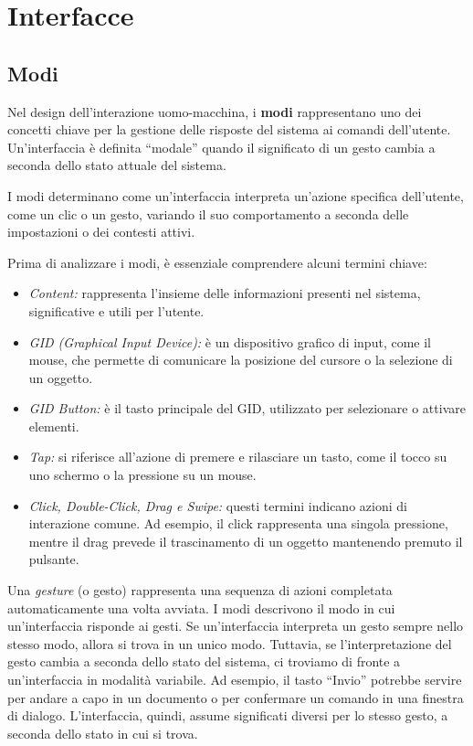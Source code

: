 \chapter{Interfacce}
\section{Modi}
\begin{redbar}
Nel design dell’interazione uomo-macchina, i \textbf{modi} rappresentano uno dei concetti chiave per la gestione delle risposte del sistema ai comandi dell’utente. Un'interfaccia è definita “modale” quando il significato di un gesto cambia a seconda dello stato attuale del sistema. 
\end{redbar}

I modi determinano come un'interfaccia interpreta un'azione specifica dell'utente, come un clic o un gesto, variando il suo comportamento a seconda delle impostazioni o dei contesti attivi.

Prima di analizzare i modi, è essenziale comprendere alcuni termini chiave:
\begin{itemize}
    \item \textit{Content:} rappresenta l'insieme delle informazioni presenti nel sistema, significative e utili per l'utente.
    \item \textit{GID (Graphical Input Device):} è un dispositivo grafico di input, come il mouse, che permette di comunicare la posizione del cursore o la selezione di un oggetto.
    \item \textit{GID Button:} è il tasto principale del GID, utilizzato per selezionare o attivare elementi.
    \item \textit{Tap:} si riferisce all'azione di premere e rilasciare un tasto, come il tocco su uno schermo o la pressione su un mouse.
    \item \textit{Click, Double-Click, Drag e Swipe:} questi termini indicano azioni di interazione comune. Ad esempio, il click rappresenta una singola pressione, mentre il drag prevede il trascinamento di un oggetto mantenendo premuto il pulsante.
\end{itemize}
Una \textit{gesture} (o gesto) rappresenta una sequenza di azioni completata automaticamente una volta avviata. I modi descrivono il modo in cui un'interfaccia risponde ai gesti. Se un'interfaccia interpreta un gesto sempre nello stesso modo, allora si trova in un unico modo. Tuttavia, se l'interpretazione del gesto cambia a seconda dello stato del sistema, ci troviamo di fronte a un'interfaccia in modalità variabile. Ad esempio, il tasto “Invio” potrebbe servire per andare a capo in un documento o per confermare un comando in una finestra di dialogo. L’interfaccia, quindi, assume significati diversi per lo stesso gesto, a seconda dello stato in cui si trova.

